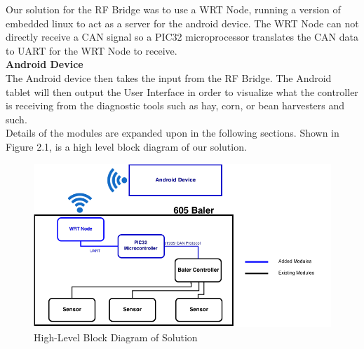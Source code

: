 \documentclass[paper=a4, fontsize=11pt]{scrartcl}
\numberwithin{equation}{section}		%
\numberwithin{figure}{section}			%
\numberwithin{table}{section}				%
\begin{document}
Our solution for the RF Bridge was to use a WRT Node, running a version of embedded linux to act as a server for the android device. The WRT Node can not directly receive a CAN signal so a PIC32 microprocessor translates the CAN data to UART for the WRT Node to receive. \\

\textbf{Android Device} \\
The Android device then takes the input from the RF Bridge. The Android tablet will then output the User Interface in order to visualize what the controller is receiving from the diagnostic tools such as hay, corn, or bean harvesters and such. \\

 Details of the modules are expanded upon in the following sections. Shown in Figure 2.1, is a high level block diagram of our solution.  \\
 \begin{figure}[ht]
	 \center\includegraphics[scale=0.36]{rev4.png}
 \caption{High-Level Block Diagram of Solution}
 \end{figure}
\end{document}
